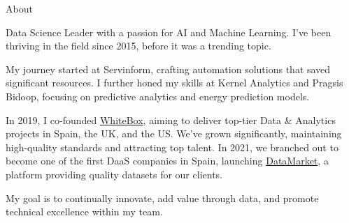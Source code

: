 \documentclass{cv}
\begin{document}
	
	
	\begin{rSection}{About}
				
		Data Science Leader with a passion for AI and Machine Learning. I've been thriving in the field since 2015, before it was a trending topic. 
		
		My journey started at Servinform, crafting automation solutions that saved significant resources. I further honed my skills at Kernel Analytics and Pragsis Bidoop, focusing on predictive analytics and energy prediction models.
		
		In 2019, I co-founded \href{https://whiteboxml.com}{WhiteBox}, aiming to deliver top-tier Data \& Analytics projects in Spain, the UK, and the US. We've grown significantly, maintaining high-quality standards and attracting top talent. In 2021, we branched out to become one of the first DaaS companies in Spain, launching \href{https://datamarket.es}{DataMarket}, a platform providing quality datasets for our clients.
		
		My goal is to continually innovate, add value through data, and promote technical excellence within my team.
		
	\end{rSection}
	
	
\end{document}
